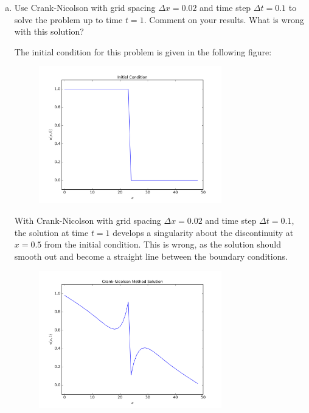 \documentclass[12pt]{article}
\begin{document}
\begin{enumerate}[(a)]
\item Use Crank-Nicolson with grid spacing $\Delta x = 0.02$ and time step $\Delta t = 0.1$ to solve the problem up to time $t=1$. Comment on your results.  What is wrong with this solution?

The initial condition for this problem is given in the following figure:
\begin{figure}[H]
\centering\includegraphics[width=0.75\textwidth]{problem3_initial_condition.png}
\end{figure}

With Crank-Nicolson with grid spacing $\Delta x = 0.02$ and time step $\Delta t = 0.1$, the solution at time $t=1$ develops a singularity about the discontinuity at $x=0.5$ from the initial condition.  This is wrong, as the solution should smooth out and become a straight line between the boundary conditions.

\begin{figure}[H]
\centering\includegraphics[width=0.75\textwidth]{problem3_crank_nicolson_issue.png}
\end{figure}


\end{enumerate}
\end{document}
